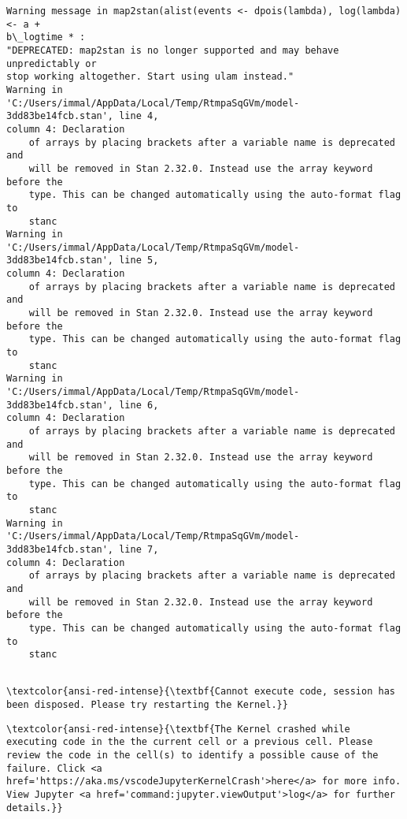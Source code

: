 \documentclass[11pt]{article}
\begin{document}
    \begin{Verbatim}[commandchars=\\\{\}]
Warning message in map2stan(alist(events <- dpois(lambda), log(lambda) <- a +
b\_logtime * :
"DEPRECATED: map2stan is no longer supported and may behave unpredictably or
stop working altogether. Start using ulam instead."
Warning in
'C:/Users/immal/AppData/Local/Temp/RtmpaSqGVm/model-3dd83be14fcb.stan', line 4,
column 4: Declaration
    of arrays by placing brackets after a variable name is deprecated and
    will be removed in Stan 2.32.0. Instead use the array keyword before the
    type. This can be changed automatically using the auto-format flag to
    stanc
Warning in
'C:/Users/immal/AppData/Local/Temp/RtmpaSqGVm/model-3dd83be14fcb.stan', line 5,
column 4: Declaration
    of arrays by placing brackets after a variable name is deprecated and
    will be removed in Stan 2.32.0. Instead use the array keyword before the
    type. This can be changed automatically using the auto-format flag to
    stanc
Warning in
'C:/Users/immal/AppData/Local/Temp/RtmpaSqGVm/model-3dd83be14fcb.stan', line 6,
column 4: Declaration
    of arrays by placing brackets after a variable name is deprecated and
    will be removed in Stan 2.32.0. Instead use the array keyword before the
    type. This can be changed automatically using the auto-format flag to
    stanc
Warning in
'C:/Users/immal/AppData/Local/Temp/RtmpaSqGVm/model-3dd83be14fcb.stan', line 7,
column 4: Declaration
    of arrays by placing brackets after a variable name is deprecated and
    will be removed in Stan 2.32.0. Instead use the array keyword before the
    type. This can be changed automatically using the auto-format flag to
    stanc


    \end{Verbatim}

    \begin{Verbatim}[commandchars=\\\{\}, frame=single, framerule=2mm, rulecolor=\color{outerrorbackground}]
\textcolor{ansi-red-intense}{\textbf{Cannot execute code, session has been disposed. Please try restarting the Kernel.}}
    \end{Verbatim}

    \begin{Verbatim}[commandchars=\\\{\}, frame=single, framerule=2mm, rulecolor=\color{outerrorbackground}]
\textcolor{ansi-red-intense}{\textbf{The Kernel crashed while executing code in the the current cell or a previous cell. Please review the code in the cell(s) to identify a possible cause of the failure. Click <a href='https://aka.ms/vscodeJupyterKernelCrash'>here</a> for more info. View Jupyter <a href='command:jupyter.viewOutput'>log</a> for further details.}}
    \end{Verbatim}
\end{document}
